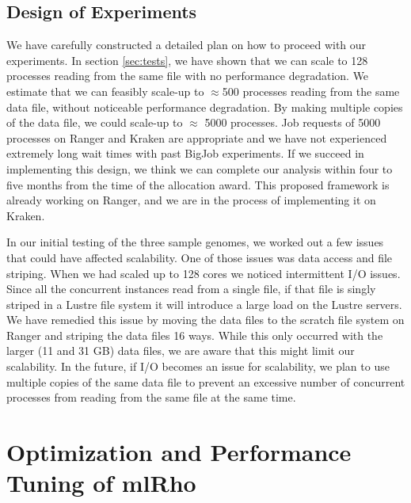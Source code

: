 \documentclass{sig-alternate}
\begin{document}
\subsection{Design of Experiments}
We have carefully constructed a detailed plan on how to proceed with our experiments. In section \ref{sec:tests}, we have shown that we can scale to 128 processes reading from the same file with no performance degradation. We estimate that we can feasibly scale-up to $\approx$500 processes reading from the same data file, without noticeable performance degradation. By making multiple copies of the data file, we could scale-up to $\approx$ 5000 processes. Job requests of 5000 processes on Ranger and Kraken are appropriate and we have not experienced extremely long wait times with past BigJob experiments. If we succeed in implementing this design, we think we can complete our analysis within four to five months from the time of the allocation award. This proposed framework is already working on Ranger, and we are in the process of implementing it on Kraken. 

In our initial testing of the three sample genomes, we worked out a few issues that could have affected
scalability. One of those issues was data access and file striping. When we had scaled up to 128 cores we
noticed intermittent I/O issues. Since all the concurrent instances read from a single file, if that file is
singly striped in a Lustre file system it will introduce a large load on the Lustre servers. We have remedied
this issue by moving the data files to the scratch file system on Ranger and striping the data files 16
ways. While this only occurred with the larger (11 and 31 GB) data files, we are aware that this might limit
our scalability. In the future, if I/O becomes an issue for scalability, we plan to use multiple copies of the
same data file to prevent an excessive number of concurrent processes from reading from the same file at the same time.

\section{Optimization and Performance Tuning of mlRho}\label{sec:optimization}
\end{document}
